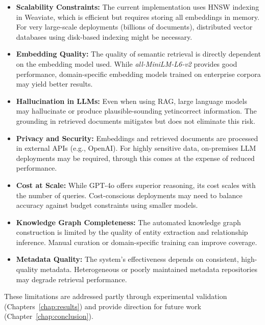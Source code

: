 \begin{itemize}
    \item \textbf{Scalability Constraints:} The current implementation uses HNSW indexing in Weaviate, which is efficient but requires storing all embeddings in memory. For very large-scale deployments (billions of documents), distributed vector databases using disk-based indexing might be necessary.
    
    \item \textbf{Embedding Quality:} The quality of semantic retrieval is directly dependent on the embedding model used. While \textit{all-MiniLM-L6-v2} provides good performance, domain-specific embedding models trained on enterprise corpora may yield better results.
    
    \item \textbf{Hallucination in LLMs:} Even when using \gls{RAG}, large language models may hallucinate or produce plausible-sounding yetincorrect information. The grounding in retrieved documents mitigates but does not eliminate this risk.
    
    \item \textbf{Privacy and Security:} Embeddings and retrieved documents are processed in external APIs (e.g., OpenAI). For highly sensitive data, on-premises \gls{LLM} deployments may be required, through this comes at the expense of reduced performance.
    
    \item \textbf{Cost at Scale:} While \gls{GPT}-4o offers superior reasoning, its cost scales with the number of queries. Cost-conscious deployments may need to balance accuracy against budget constraints using smaller models.
    
    \item \textbf{Knowledge Graph Completeness:} The automated knowledge graph construction is limited by the quality of entity extraction and relationship inference. Manual curation or domain-specific training can improve coverage.
    
    \item \textbf{Metadata Quality:} The system's effectiveness depends on consistent, high-quality metadata. Heterogeneous or poorly maintained metadata repositories may degrade retrieval performance.
    
\end{itemize}

These limitations are addressed partly through experimental validation (Chapters~\ref{chap:results}) and provide direction for future work (Chapter~\ref{chap:conclusion}).






